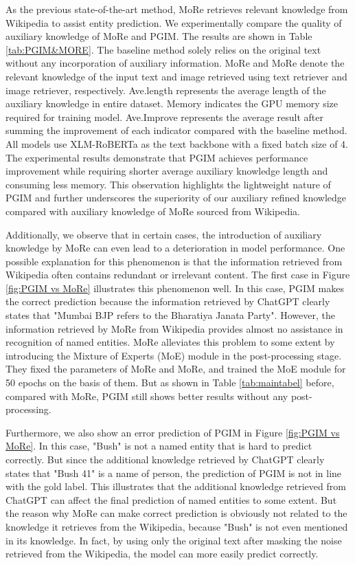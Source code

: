 \documentclass[11pt]{article}
\begin{document}
As the previous state-of-the-art method, MoRe retrieves relevant knowledge from Wikipedia to assist entity prediction. We experimentally compare the quality of auxiliary knowledge of MoRe and PGIM. The results are shown in Table \ref{tab:PGIM&MORE}. The baseline method solely relies on the original text without any incorporation of auxiliary information. 
MoRe and MoRe denote the relevant knowledge of the input text and image retrieved using text retriever and image retriever, respectively. 
Ave.length represents the average length of the auxiliary knowledge in entire dataset. Memory indicates the GPU memory size required for training model. Ave.Improve represents the average result after summing the improvement of each indicator compared with the baseline method. All models use XLM-RoBERTa \citep{conneau2019unsupervised} as the text backbone with a fixed batch size of 4. 
The experimental results demonstrate that PGIM achieves performance improvement while requiring shorter average auxiliary knowledge length and consuming less memory. This observation highlights the lightweight nature of PGIM and further underscores the superiority of our auxiliary refined knowledge compared with auxiliary knowledge of MoRe sourced from Wikipedia. 

Additionally, we observe that in certain cases, the introduction of auxiliary knowledge by MoRe can even lead to a deterioration in model performance. One possible explanation for this phenomenon is that the information retrieved from Wikipedia often contains redundant or irrelevant content. 
The first case in Figure \ref{fig:PGIM vs MoRe} illustrates this phenomenon well. In this case, PGIM makes the correct prediction because the information retrieved by ChatGPT clearly states that "Mumbai BJP refers to the Bharatiya Janata Party". However, the information retrieved by MoRe from Wikipedia provides almost no assistance in recognition of named entities. 
MoRe alleviates this problem to some extent by introducing the Mixture of Experts (MoE) module in the post-processing stage.
They fixed the parameters of MoRe and MoRe, and trained the MoE module for 50 epochs on the basis of them. But as shown in Table \ref{tab:maintabel} before, compared with MoRe, PGIM still shows better results without any post-processing.

Furthermore, we also show an error prediction of PGIM in Figure \ref{fig:PGIM vs MoRe}. In this case, "Bush" is not a named entity that is hard to predict correctly. But since the additional knowledge retrieved by ChatGPT clearly states that "Bush 41" is a name of person, the prediction of PGIM is not in line with the gold label. This illustrates that the additional knowledge retrieved from ChatGPT can affect the final prediction of named entities to some extent. But the reason why MoRe can make correct prediction is obviously not related to the knowledge it retrieves from the Wikipedia, because "Bush" is not even mentioned in its knowledge. In fact, by using only the original text after masking the noise retrieved from the Wikipedia, the model can more easily predict correctly. 
\end{document}
